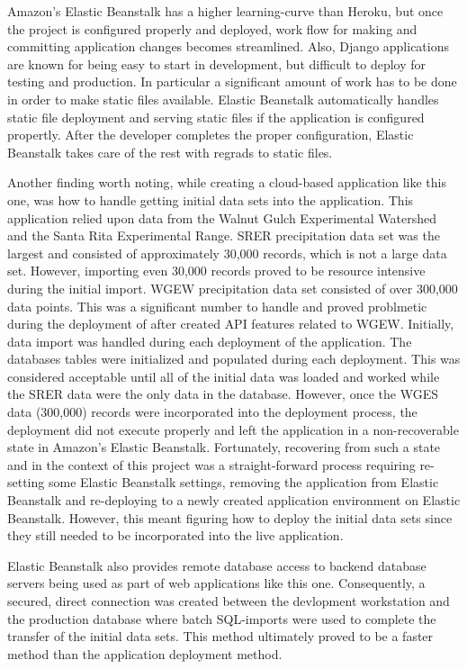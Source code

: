 Amazon's Elastic Beanstalk has a higher learning-curve than Heroku, but once 
the project is configured properly and deployed, work flow for making and 
committing application changes becomes streamlined.  Also, Django applications 
are known for being easy to start in development, but difficult to deploy for 
testing and production.  In particular a significant amount of work has to be 
done in order to make static files available.  Elastic Beanstalk automatically 
handles static file deployment and serving static files if the application is 
configured propertly.  After the developer completes the proper configuration, 
Elastic Beanstalk takes care of the rest with regrads to static files.

Another finding worth noting, while creating a cloud-based application 
like this one, was how to handle getting initial data sets into the 
application.  This application relied upon data from the Walnut Gulch 
Experimental Watershed and the Santa Rita Experimental Range. SRER 
precipitation data set was the largest and consisted of approximately 30,000 
records, which is not a large data set.  However, importing even 30,000 
records proved to be resource intensive during the initial import.  WGEW 
precipitation data set consisted of over 300,000 data points.  This was a 
significant number to handle and proved problmetic during the deployment of 
after created API features related to WGEW.  Initially, data import was 
handled during each deployment of the application.  The databases tables were 
initialized and populated during each deployment.  This was considered 
acceptable until all of the initial data was loaded and worked while the SRER 
data were the only data in the database.  However, once the WGES data 
(300,000) records were incorporated into the deployment process, the 
deployment did not execute properly and left the application in a 
non-recoverable state in Amazon's Elastic Beanstalk.  Fortunately, recovering 
from such a state and in the context of this project was a straight-forward 
process requiring re-setting some Elastic Beanstalk settings, removing the 
application from Elastic Beanstalk and re-deploying to a newly created 
application environment on Elastic Beanstalk.  However, this meant figuring 
how to deploy the initial data sets since they still needed to be 
incorporated into the live application.  

Elastic Beanstalk also provides remote database access to backend database 
servers being used as part of web applications like this one.  Consequently, 
a secured, direct connection was created between the devlopment workstation 
and the production database where batch SQL-imports were used to complete the 
transfer of the initial data sets.  This method ultimately proved to be a 
faster method than the application deployment method.

